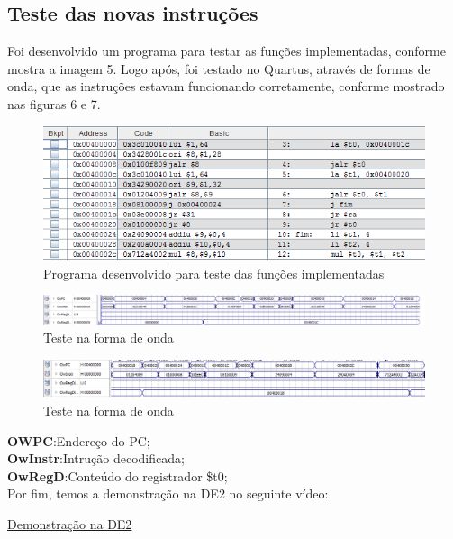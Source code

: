 \documentclass[12pt]{article}
\begin{document}
\subsection{Teste das novas instruções}
\label{subsec:testeisa}

Foi desenvolvido um programa para testar as funções implementadas, conforme mostra a imagem 5. Logo após, foi testado no Quartus, através de formas de onda, que as instruções estavam funcionando corretamente, conforme mostrado nas figuras 6 e 7.   

\begin{figure}[H]
	\flushleft
	\includegraphics[width=1\textwidth]{programa.png}
	\caption{Programa desenvolvido para teste das funções implementadas}
	\label{fig:pest}
\end{figure}
\begin{figure}[H]
	\flushleft
	\includegraphics[width=1\textwidth]{teste.png}
	\caption{Teste na forma de onda}
	\label{fig:pest}
\end{figure}
\begin{figure}[H]
	\flushleft
	\includegraphics[width=1\textwidth]{images/teste1.png}
	\caption{Teste na forma de onda}
	\label{fig:pest}
\end{figure}


\textbf{OWPC}:Endereço do PC;\\
\textbf{OwInstr}:Intrução decodificada;\\
\textbf{OwRegD}:Conteúdo do registrador \$t0;\\



Por fim, temos a demonstração na DE2 no seguinte vídeo:

\href{https://youtu.be/aTrqM8m8FJc}{Demonstração na DE2}



\end{document}
